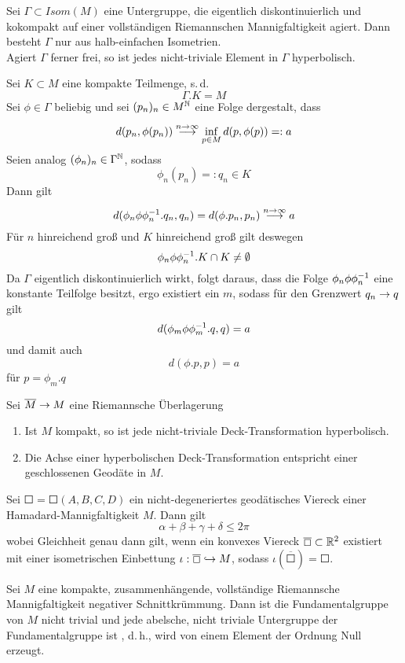\documentclass{book}
\renewcommand{\l}[1]{\overline{#1}}
\begin{document}
\Lem{}
Sei $\Gamma \subset Isom(M)$ eine Untergruppe, die eigentlich diskontinuierlich und kokompakt auf einer vollständigen Riemannschen Mannigfaltigkeit agiert. Dann besteht $\Gamma$ nur aus halb-einfachen Isometrien.\\
Agiert $\Gamma$ ferner frei, so ist jedes nicht-triviale Element in $\Gamma$ hyperbolisch.
\begin{Beweis}{}
Sei $K\subset M$ eine kompakte Teilmenge, s.\,d.
\[ \Gamma.K = M \]
Sei $\phi \in \Gamma$ beliebig und sei $(p_n)_n \in M^{\mathbb{N}}$ eine Folge dergestalt, dass
\[ d(p_n, \phi(p_n)) \overset{n\overset{}{\rightarrow} \infty}{\longrightarrow} \inf_{p\in M}d(p, \phi(p)) =: a \]
Seien analog $(\phi_n)_n \in \Gamma^{\mathbb{N}}$, sodass
\[ \phi_n(p_n) =: q_n \in K \]
Dann gilt
\[ d(\phi_n \phi \phi_n^{-1} .q_n, q_n) = d(\phi.p_n, p_n) \overset{n\overset{}{\rightarrow} \infty}{\longrightarrow} a  \]
Für $n$ hinreichend groß und $K$ hinreichend groß gilt deswegen
\[ \phi_n\phi \phi_n^{-1}.K \cap K \neq \emptyset \]
Da $\Gamma$ eigentlich diskontinuierlich wirkt, folgt daraus, dass die Folge $\phi_n\phi \phi_n^{-1}$ eine konstante Teilfolge besitzt, ergo existiert ein $m$, sodass für den Grenzwert $q_n \overset{}{\rightarrow} q$ gilt
\[ d(\phi_m \phi \phi_m^{-1}.q, q) = a \]
und damit auch
\[ d(\phi.p, p) = a \]
für $p = \phi_m.q$
\end{Beweis}

\Bem{}
Sei $\l M \pfeil{} M$ eine Riemannsche Überlagerung
\begin{enumerate}[1.)]
\item Ist $M$ kompakt, so ist jede nicht-triviale Deck-Transformation hyperbolisch.
\item Die Achse einer hyperbolischen Deck-Transformation entspricht einer geschlossenen Geodäte in $M$.
\end{enumerate}

\Lem{}
Sei $\Square = \Square(A,B,C,D)$ ein nicht-degeneriertes geodätisches Viereck einer Hamadard-Mannigfaltigkeit $M$. Dann gilt
\[ \alpha + \beta + \gamma +\delta \leq 2\pi \]
wobei Gleichheit genau dann gilt, wenn ein konvexes Viereck $\l \Square \subset \R^2$ existiert mit einer isometrischen Einbettung $\iota : \l \Square \inj{} M$, sodass $\iota(\l \Square) = \Square$.

Sei $M$ eine kompakte, zusammenhängende, vollständige Riemannsche Mannigfaltigkeit negativer Schnittkrümmung. Dann ist die Fundamentalgruppe von $M$ nicht trivial und jede abelsche, nicht triviale Untergruppe der Fundamentalgruppe ist , d.\,h., wird von einem Element der Ordnung Null erzeugt.
\end{document}
